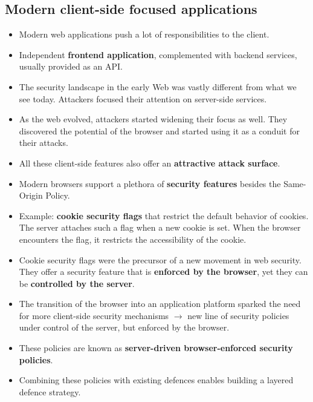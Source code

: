 \documentclass[../main.tex]{subfiles}
\begin{document}
\subsection{Modern client-side focused applications}
\begin{itemize}
\item Modern web applications push a lot of responsibilities to the client.
\item Independent \textbf{frontend application}, complemented with backend services, usually provided as an API.
\item The security landscape in the early Web was vastly different from what we see today. Attackers focused their attention on server-side services.
\item As the web evolved, attackers started widening their focus as well. They discovered the potential of the browser and started using it as a conduit for their attacks.
\item All these client-side features also offer an \textbf{attractive attack surface}.
\item Modern browsers support a plethora of \textbf{security features} besides the Same-Origin Policy.
\item Example: \textbf{cookie security flags} that restrict the default behavior of cookies. The server attaches such a flag when a new cookie is set. When the browser encounters the flag, it restricts the accessibility of the cookie.
\item Cookie security flags were the precursor of a new movement in web security. They offer a security feature that is \textbf{enforced by the browser}, yet they can be \textbf{controlled by the server}.
\item The transition of the browser into an application platform sparked the need for more client-side security mechanisms $\rightarrow$ new line of security policies under control of the server, but enforced by the browser.
\item These policies are known as \textbf{server-driven browser-enforced security policies}.
\item Combining these policies with existing defences enables building a layered defence strategy.
\end{itemize}
\end{document}
